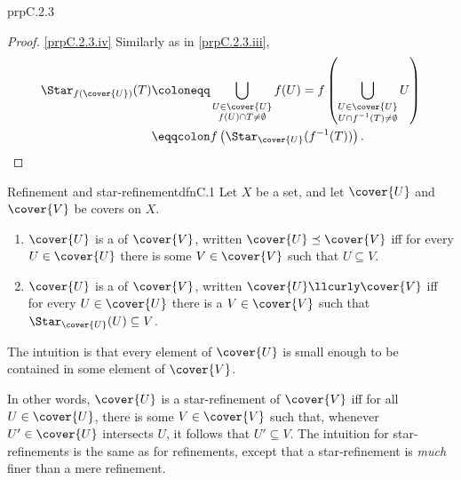 \begin{prp}{}{prpC.2.3}
\begin{proof}
\blankline
\noindent
\cref{prpC.2.3.iv} Similarly as in \cref{prpC.2.3.iii},
\begin{equation}
\begin{split}
\Star _{f(\cover{U})}(T) & \coloneqq \bigcup _{\substack{U\in \cover{U} \\ f(U)\cap T\neq \emptyset}}f(U)=f\left( \bigcup _{\substack{U\in \cover{U} \\ U\cap f^{-1}(T)\neq \emptyset}}U\right) \\
& \eqqcolon f\left( \Star _{\cover{U}}(f^{-1}(T))\right) .
\end{split}
\end{equation}
\end{proof}
\end{prp}

\begin{dfn}{Refinement and star-refinement}{dfnC.1}
Let $X$ be a set, and let $\cover{U}$ and $\cover{V}$ be covers on $X$.
\begin{enumerate}
\item $\cover{U}$ is a  of $\cover{V}$, written $\cover{U}\preceq \cover{V}$ iff for every $U\in \cover{U}$ there is some $V\in \cover{V}$ such that $U\subseteq V$.
\item $\cover{U}$ is a  of $\cover{V}$, written $\cover{U}\llcurly \cover{V}$ iff for every $U\in \cover{U}$ there is a $V\in \cover{V}$ such that $\Star _{\cover{U}}(U)\subseteq V$.
\end{enumerate}
\begin{rmk}
The intuition is that every element of $\cover{U}$ is small enough to be contained in some element of $\cover{V}$.
\end{rmk}
\begin{rmk}
In other words, $\cover{U}$ is a star-refinement of $\cover{V}$ iff for all $U\in \cover{U}$, there is some $V\in \cover{V}$ such that, whenever $U'\in \cover{U}$ intersects $U$, it follows that $U'\subseteq V$.  The intuition for star-refinements is the same as for refinements, except that a star-refinement is \emph{much} finer than a mere refinement.
\end{rmk}
\end{dfn}
